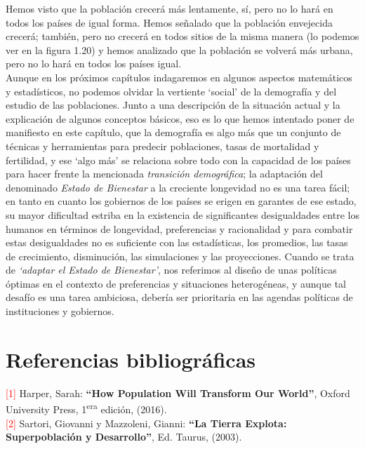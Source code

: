 Hemos visto que la población crecerá más lentamente, sí, pero no lo hará en todos los países de igual forma. Hemos señalado que la población envejecida crecerá; también, pero no crecerá en todos sitios de la misma manera (lo podemos ver en la figura 1.20) y hemos analizado que la población se volverá más urbana, pero no lo hará en todos los países igual.\\ 

Aunque en los próximos capítulos indagaremos en algunos aspectos matemáticos y estadísticos, no podemos olvidar la vertiente `social' de la demografía y del estudio de las poblaciones. Junto a una descripción de la situación actual y la explicación de algunos conceptos básicos, eso es lo que hemos intentado poner de manifiesto en este capítulo, que la demografía es algo más que un conjunto de técnicas y herramientas para predecir poblaciones, tasas de mortalidad y fertilidad, y ese `algo más' se relaciona sobre todo con la capacidad de los países para hacer frente la mencionada \textit{transición demográfica}; la adaptación del denominado \textit{Estado de Bienestar} a la creciente longevidad no es una tarea fácil; en tanto en cuanto los gobiernos de los países se erigen en garantes de ese estado, su mayor dificultad estriba en la existencia de significantes desigualdades entre los humanos en términos de longevidad, preferencias y racionalidad y para combatir estas desigualdades no es suficiente con las estadísticas, los promedios, las tasas de crecimiento, disminución, las simulaciones y las proyecciones. Cuando se trata de \textit{`adaptar el Estado de Bienestar'}, nos referimos al diseño de unas políticas óptimas en el contexto de preferencias y situaciones heterogéneas, y aunque tal desafío es una tarea ambiciosa, debería ser prioritaria en las agendas políticas de instituciones y gobiernos.\\

\newpage
\section*{Referencias bibliogr\'aficas}
%

\noindent \textcolor{red}{[1]} Harper, Sarah: \textbf{``How Population Will Transform Our World''}, Oxford University Press, 1\textsuperscript{era} edici\'on, (2016).\\

\vspace{-0.23cm}
\noindent \textcolor{red}{[2]} Sartori, Giovanni y Mazzoleni, Gianni: \textbf{``La Tierra Explota: Superpoblaci\'on y Desarrollo''}, Ed. Taurus, (2003).\\

